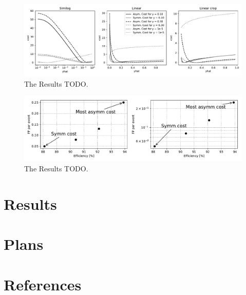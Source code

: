 \documentclass[a4paper]{jpconf}
\begin{document}
\begin{figure}
	\centering
	\includegraphics[width=\textwidth]{images/LossPaper.pdf}
	\caption{The Results TODO.}
	\label{fig:loss}
\end{figure}

\begin{figure}
	\centering
	\includegraphics[width=.8\textwidth]{images/EffVsFP2paper.pdf}
	\caption{The Results TODO.}
	\label{fig:efffp}
\end{figure}




\section{Results}

\section{Plans}

\section*{References}

% 
\end{document}
